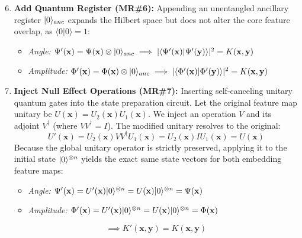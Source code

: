 \documentclass[12pt,a4paper]{article}
\DeclarePairedDelimiter\ket{\lvert}{\rangle}
\begin{document}
		\begin{enumerate}
			\setcounter{enumi}{5}
			\item \textbf{Add Quantum Register (MR\#6):} Appending an unentangled ancillary register $\ket{0}_{anc}$ expands the Hilbert space but does not alter the core feature overlap, as $\langle 0 | 0 \rangle = 1$:
			\begin{itemize}
				\item \textit{Angle:} $\Psi'(\mathbf{x}) = \Psi(\mathbf{x}) \otimes \ket{0}_{anc} \implies |\langle \Psi'(\mathbf{x}) | \Psi'(\mathbf{y}) \rangle|^2 = K(\mathbf{x}, \mathbf{y})$
				\item \textit{Amplitude:} $\Phi'(\mathbf{x}) = \Phi(\mathbf{x}) \otimes \ket{0}_{anc} \implies |\langle \Phi'(\mathbf{x}) | \Phi'(\mathbf{y}) \rangle|^2 = K(\mathbf{x}, \mathbf{y})$
			\end{itemize}
			
			\item \textbf{Inject Null Effect Operations (MR\#7):} Inserting self-canceling unitary quantum gates into the state preparation circuit. Let the original feature map unitary be $U(\mathbf{x}) = U_2(\mathbf{x}) U_1(\mathbf{x})$. We inject an operation $V$ and its adjoint $V^\dagger$ (where $V V^\dagger = I$). The modified unitary resolves to the original:
			$$ U'(\mathbf{x}) = U_2(\mathbf{x}) V V^\dagger U_1(\mathbf{x}) = U_2(\mathbf{x}) I U_1(\mathbf{x}) = U(\mathbf{x}) $$
			Because the global unitary operator is strictly preserved, applying it to the initial state $\ket{0}^{\otimes n}$ yields the exact same state vectors for both embedding feature maps:
			\begin{itemize}
				\item \textit{Angle:} $\Psi'(\mathbf{x}) = U'(\mathbf{x})\ket{0}^{\otimes n} = U(\mathbf{x})\ket{0}^{\otimes n} = \Psi(\mathbf{x})$
				\item \textit{Amplitude:} $\Phi'(\mathbf{x}) = U'(\mathbf{x})\ket{0}^{\otimes n} = U(\mathbf{x})\ket{0}^{\otimes n} = \Phi(\mathbf{x})$
			\end{itemize}
			$$ \implies K'(\mathbf{x}, \mathbf{y}) = K(\mathbf{x}, \mathbf{y}) $$
			

\end{enumerate}
\end{document}
